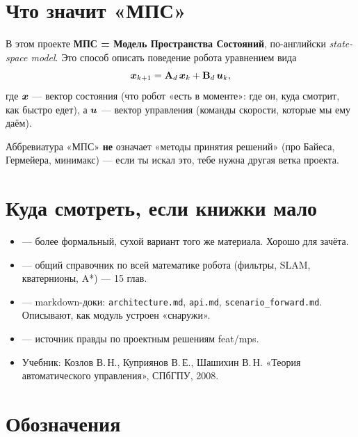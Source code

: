 \section{Что значит «МПС»}

\begin{ideabox}
В этом проекте \textbf{МПС = Модель Пространства Состояний}, по-английски
\emph{state-space model}. Это способ описать поведение робота уравнением
вида
\[
  \bm{x}_{k+1} = \mathbf{A}_d\,\bm{x}_k + \mathbf{B}_d\,\bm{u}_k,
\]
где $\bm{x}$ --- вектор состояния (что робот «есть в моменте»: где он,
куда смотрит, как быстро едет), а $\bm{u}$ --- вектор управления (команды
скорости, которые мы ему даём).

Аббревиатура «МПС» \textbf{не} означает «методы принятия решений» (про
Байеса, Гермейера, минимакс) --- если ты искал это, тебе нужна другая
ветка проекта.
\end{ideabox}

\section{Куда смотреть, если книжки мало}

\begin{itemize}
  \item {} --- более формальный, сухой
        вариант того же материала. Хорошо для зачёта.
  \item {} --- общий справочник по всей
        математике робота (фильтры, SLAM, кватернионы, A*) --- 15 глав.
  \item {} --- markdown-доки: \texttt{architecture.md},
        \texttt{api.md}, \texttt{scenario\_forward.md}. Описывают, как
        модуль устроен «снаружи».
  \item {}
        --- источник правды по проектным решениям feat/mps.
  \item Учебник: Козлов В.\,Н., Куприянов В.\,Е., Шашихин В.\,Н.
        «Теория автоматического управления», СПбГПУ, 2008.
\end{itemize}

\section{Обозначения}

